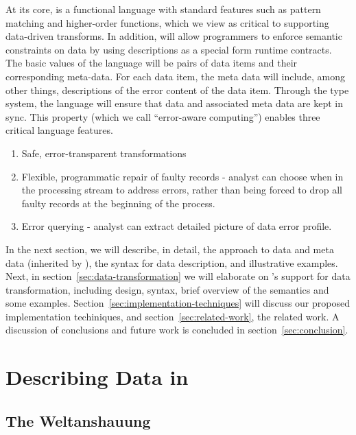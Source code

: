 \documentclass{entcs}
\begin{document}
At its core, \datatype{} is a functional language with standard
features such as pattern matching and higher-order functions, which we
view as critical to supporting data-driven transforms. In addition,
\datatype{} will allow programmers to enforce semantic constraints on
data by using \datatype{} descriptions as a special form runtime
contracts. The basic values of the language will be pairs of data
items and their corresponding meta-data. For each data item, the meta
data will include, among other things, descriptions of the error
content of the data item. Through the type system, the language will
ensure that data and associated meta data are kept in sync. This
property (which we call ``error-aware computing'') enables three
critical language features.
\begin{enumerate}
\item Safe, error-transparent transformations
\item Flexible, programmatic repair of faulty records - analyst can
  choose when in the processing stream to address errors, rather than
  being forced to drop all faulty records at the beginning of the process.
\item Error querying - analyst can extract detailed picture of data
  error profile.
\end{enumerate}

In the next section, we will describe, in detail, the \pads{} approach
to data and meta data (inherited by \datatype{}), the \datatype{}
syntax for data description, and illustrative examples. Next, in
section~\ref{sec:data-transformation} we will elaborate on \datatype{}'s support for
data transformation, including design, syntax, brief overview of the semantics
and some examples. Section~\ref{sec:implementation-techniques} will discuss our proposed
implementation techiniques, and section~\ref{sec:related-work}, the
related work. A discussion of conclusions and future work is concluded
in section~\ref{sec:conclusion}.

\section{Describing Data in \datatype{}}
\label{sec:data-description}

\subsection{The \pads{} Weltanshauung}
\end{document}
